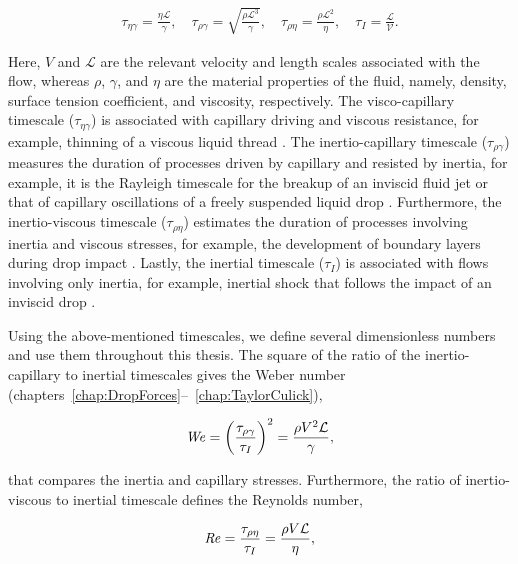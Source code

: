 \begin{align}
	\tau_{\eta\gamma} = \frac{\eta\mathcal{L}}{\gamma}, \quad \tau_{\rho\gamma} = \sqrt{\frac{\rho\mathcal{L}^3}{\gamma}}, \quad \tau_{\rho\eta} = \frac{\rho\mathcal{L}^2}{\eta}, \quad  \tau_I = \frac{\mathcal{L}}{\mathcal{V}}.
\end{align}

\noindent Here, $V$ and $\mathcal{L}$ are the relevant velocity and length scales associated with the flow, whereas $\rho$, $\gamma$, and $\eta$ are the material properties of the fluid, namely, density, surface tension coefficient, and viscosity, respectively. The visco-capillary timescale ($\tau_{\eta\gamma}$) is associated with capillary driving and viscous resistance, for example, thinning of a viscous liquid thread \citep{eggers2015singularities}. The inertio-capillary timescale ($\tau_{\rho\gamma}$) measures the duration of processes driven by capillary and resisted by inertia, for example, it is the Rayleigh timescale for the breakup of an inviscid fluid jet or that of capillary oscillations of a freely suspended liquid drop \citep{rayleigh1879capillary}. Furthermore, the inertio-viscous timescale ($\tau_{\rho\eta}$) estimates the duration of processes involving inertia and viscous stresses, for example, the development of boundary layers during drop impact \citep{eggers2010drop}. Lastly, the inertial timescale ($\tau_I$) is associated with flows involving only inertia, for example, inertial shock that follows the impact of an inviscid drop \citep{cheng2021drop}. 

Using the above-mentioned timescales, we define several dimensionless numbers and use them throughout this thesis. The square of the ratio of the inertio-capillary to inertial timescales gives the Weber number (chapters~\ref{chap:DropForces}--~\ref{chap:TaylorCulick}),
 
\begin{align}\label{Ch0::We}
	\mathit{We} = \left(\frac{\tau_{\rho\gamma}}{\tau_I}\right)^2 =  \frac{\rho V^2\mathcal{L}}{\gamma},
\end{align}

\noindent that compares the inertia and capillary stresses. Furthermore, the ratio of inertio-viscous to inertial timescale defines the Reynolds number, 

\begin{align}\label{Ch0::Re}
	\mathit{Re} = \frac{\tau_{\rho\eta}}{\tau_I} =  \frac{\rho V\mathcal{L}}{\eta},
\end{align}

